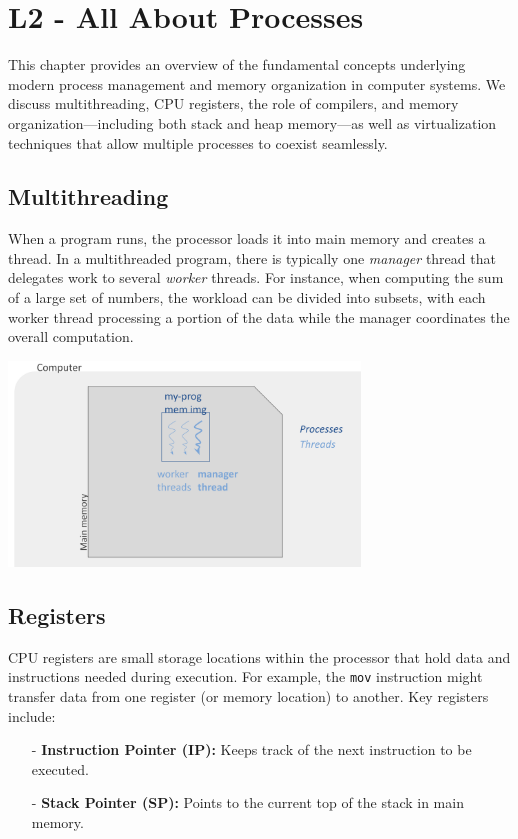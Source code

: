 
\chapter{L2 - All About Processes}

This chapter provides an overview of the fundamental concepts underlying modern process management and memory organization in computer systems. We discuss multithreading, CPU registers, the role of compilers, and memory organization—including both stack and heap memory—as well as virtualization techniques that allow multiple processes to coexist seamlessly.

\section{Multithreading}
When a program runs, the processor loads it into main memory and creates a thread. In a multithreaded program, there is typically one \emph{manager} thread that delegates work to several \emph{worker} threads. For instance, when computing the sum of a large set of numbers, the workload can be divided into subsets, with each worker thread processing a portion of the data while the manager coordinates the overall computation.

\begin{center}
    \includegraphics[width=0.7\textwidth]{chapters/L2/images/multi_threads.png}
\end{center}
\newpage
\section{Registers}
CPU registers are small storage locations within the processor that hold data and instructions needed during execution. For example, the \texttt{mov} instruction might transfer data from one register (or memory location) to another. Key registers include:
\begin{itemize}
  \item[-] \textbf{Instruction Pointer (IP):} Keeps track of the next instruction to be executed.
  \item[-] \textbf{Stack Pointer (SP):} Points to the current top of the stack in main memory.
\end{itemize}

